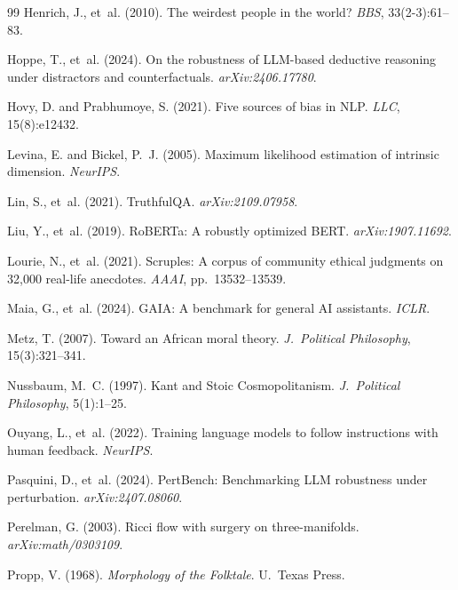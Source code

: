 \documentclass[11pt]{article}
\begin{document}
\begin{thebibliography}{99}
Henrich, J., et~al. (2010). The weirdest people in the world? \textit{BBS}, 33(2-3):61--83.

Hoppe, T., et~al. (2024). On the robustness of LLM-based deductive reasoning under distractors and counterfactuals. \textit{arXiv:2406.17780}.

Hovy, D. and Prabhumoye, S. (2021). Five sources of bias in NLP. \textit{LLC}, 15(8):e12432.

Levina, E. and Bickel, P.~J. (2005). Maximum likelihood estimation of intrinsic dimension. \textit{NeurIPS}.

Lin, S., et~al. (2021). TruthfulQA. \textit{arXiv:2109.07958}.

Liu, Y., et~al. (2019). RoBERTa: A robustly optimized BERT. \textit{arXiv:1907.11692}.

Lourie, N., et~al. (2021). Scruples: A corpus of community ethical judgments on 32,000 real-life anecdotes. \textit{AAAI}, pp.~13532--13539.

Maia, G., et~al. (2024). GAIA: A benchmark for general AI assistants. \textit{ICLR}.

Metz, T. (2007). Toward an African moral theory. \textit{J.~Political Philosophy}, 15(3):321--341.

Nussbaum, M.~C. (1997). Kant and Stoic Cosmopolitanism. \textit{J.~Political Philosophy}, 5(1):1--25.

Ouyang, L., et~al. (2022). Training language models to follow instructions with human feedback. \textit{NeurIPS}.

Pasquini, D., et~al. (2024). PertBench: Benchmarking LLM robustness under perturbation. \textit{arXiv:2407.08060}.

Perelman, G. (2003). Ricci flow with surgery on three-manifolds. \textit{arXiv:math/0303109}.

Propp, V. (1968). \textit{Morphology of the Folktale}. U.~Texas Press.


\end{thebibliography}
\end{document}
